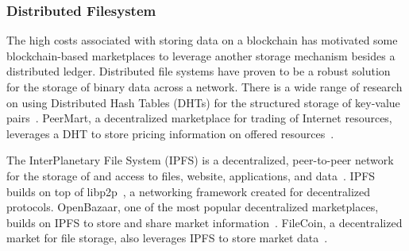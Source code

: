 \subsubsection{Distributed Filesystem}
The high costs associated with storing data on a blockchain has motivated some blockchain-based marketplaces to leverage another storage mechanism besides a distributed ledger.
Distributed file systems have proven to be a robust solution for the storage of binary data across a network.
There is a wide range of research on using Distributed Hash Tables (DHTs) for the structured storage of key-value pairs~\cite{maymounkov2002kademlia}.
PeerMart, a decentralized marketplace for trading of Internet resources, leverages a DHT to store pricing information on offered resources~\cite{hausheer2006peermart}.

The InterPlanetary File System (IPFS) is a decentralized, peer-to-peer network for the storage of and access to files, website, applications, and data~\cite{benet2014ipfs}.
IPFS builds on top of libp2p~\cite{benet2018libp2p}, a networking framework created for decentralized protocols.
OpenBazaar, one of the most popular decentralized marketplaces, builds on IPFS to store and share market information~\cite{openbazaar}.
FileCoin, a decentralized market for file storage, also leverages IPFS to store market data~\cite{benet2018filecoin}.

